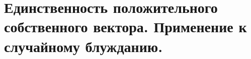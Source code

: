 \section{
 Единственность положительного собственного вектора. Применение к случайному блужданию.
}
